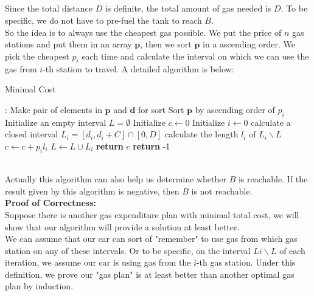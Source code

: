 \documentclass[12pt,letterpaper]{article}
\begin{document}
\newpage
\subsection{}
Since the total distance $D$ is definite,
the total amount of gas needed is $D$.
To be specific, we do not have to pre-fuel the tank to reach $B$.\\
So the idea is to always use the cheapest gas possible.
We put the price of $n$ gas stations and put them in an array $\boldsymbol{p}$,
then we sort $\boldsymbol{p}$ in a ascending order. 
We pick the cheapest $p_i$ each time and calculate the interval
on which we can use the gas from $i$-th station to travel.
A detailed algorithm is below:
\begin{algorithm}
  \caption{Minimal Cost}\label{alg:mcost}
  \begin{algorithmic}[1]
  :
  \State Make pair of elements in $\boldsymbol{p}$ and $\boldsymbol{d}$ for sort
  \State Sort $\boldsymbol{p}$ by ascending order of $p_i$
  \State Initialize an empty interval $L=\emptyset$
  \State Initialize $c\gets 0$
  \State Initialize $i\gets 0$
  \State calculate a closed interval $L_i=[d_i,d_i+C]\cap[0,D]$
  \State calculate the length $l_i$ of $L_i\backslash L$
  \State $c\gets c+p_il_i$
  \State $L\gets L\cup L_i$
  \State \textbf{return} $c$
  \EndIf
  \EndWhile
  \State \textbf{return} -1
  \EndProcedure
  \end{algorithmic}
\end{algorithm}\\
Actually this algorithm can also help us determine whether $B$ is reachable.
If the result given by this algorithm is negative,
then $B$ is not reachable.\\
\textbf{Proof of Correctness:}\\
Suppose there is another gas expenditure plan with minimal total cost,
we will show that our algorithm will provide a solution at least better.\\
We can assume that our car can sort of "remember" to use gas
from which gas station on any of these intervals.
Or to be specific, on the interval $Li\backslash L$ of each iteration,
we assume our car is using gas from the $i$-th gas station.
Under this definition, 
we prove our "gas plan" is at least better than another optimal gas plan by induction.\\
\end{document}
